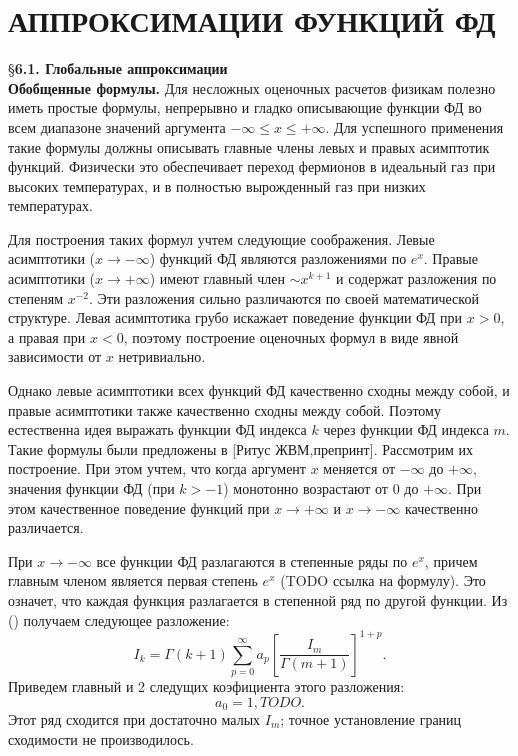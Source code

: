 \chapter{АППРОКСИМАЦИИ ФУНКЦИЙ ФД}

\S \textbf{6.1. Глобальные аппроксимации}
\\

\textbf{Обобщенные формулы.} Для несложных оценочных расчетов физикам полезно
иметь простые формулы, непрерывно и гладко описывающие функции ФД во всем диапазоне значений аргумента
$-\infty \leqslant x \leqslant +\infty$. Для успешного применения такие формулы должны описывать главные
члены левых и правых асимптотик функций. Физически это обеспечивает переход фермионов в
идеальный газ при высоких температурах, и в полностью вырожденный газ при низких
температурах.

Для построения таких формул учтем следующие соображения. Левые асимптотики ($x \to -\infty$) функций ФД являются разложениями по $e^x$. Правые асимптотики ($x \to +\infty$) имеют главный член $\sim x^{k+1}$ и содержат разложения по степеням $x^{-2}$. Эти разложения сильно различаются по своей математической структуре. Левая асимптотика грубо искажает поведение функции ФД при $x > 0$, а правая при $x < 0$, поэтому построение оценочных формул в виде явной зависимости от $x$ нетривиально.

Однако левые асимптотики всех функций ФД качественно сходны между собой, и правые асимптотики также качественно сходны между собой. Поэтому естественна идея выражать функции ФД индекса $k$ через функции ФД индекса $m$. Такие формулы были предложены в [Ритус ЖВМ,препринт]. Рассмотрим их построение. При этом учтем, что когда аргумент $x$ меняется от $-\infty$ до $+\infty$, значения функции ФД (при $k>-1$) монотонно возрастают от $0$ до $+\infty$. При этом качественное поведение функций при $x \to +\infty$ и $x \to -\infty$ качественно различается.

При $x \to -\infty$ все функции ФД разлагаются в степенные ряды по $e^x$, причем главным членом является первая степень $e^x$ (TODO ссылка на формулу). Это означет, что каждая функция разлагается в степенной ряд по другой функции. Из () получаем следующее разложение:
\begin{equation}
I_k = \Gamma(k+1) \sum\limits_{p=0}^{\infty} a_p[\frac{I_m}{\Gamma(m+1)}]^{1+p}.
\label{eq:ref_6_1_1}
\end{equation} 
Приведем главный и 2 следущих коэфициента этого разложения:
\begin{equation}
a_0=1, TODO.
\label{eq:ref_6_1_2}
\end{equation} 
Этот ряд сходится при достаточно малых $I_m$; точное установление границ сходимости не производилось.

